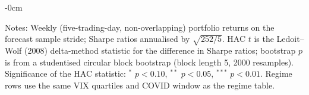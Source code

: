 \begin{table}[htbp]
\begin{adjustwidth}{-\extralength}{0cm}
\begin{tablenotes}\small
\item Notes: Weekly (five-trading-day, non-overlapping) portfolio returns on the forecast sample stride; Sharpe ratios annualised by $\sqrt{252/5}$. HAC $t$ is the Ledoit--Wolf (2008) delta-method statistic for the difference in Sharpe ratios; bootstrap $p$ is from a studentised circular block bootstrap (block length 5, 2000 resamples). Significance of the HAC statistic: $^{*}$ $p<0.10$, $^{**}$ $p<0.05$, $^{***}$ $p<0.01$. Regime rows use the same VIX quartiles and COVID window as the regime table.
\end{tablenotes}
\end{adjustwidth}
\end{table}
